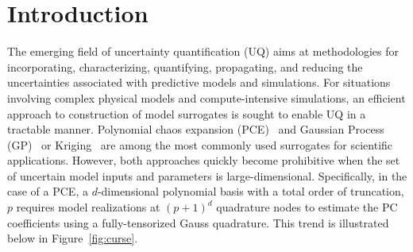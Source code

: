 \section{Introduction}
\label{sec:intro}


The emerging field of uncertainty quantification (UQ) aims at methodologies for 
incorporating, characterizing, quantifying, propagating, and reducing the 
uncertainties associated with predictive models and simulations. For situations
involving complex physical models and compute-intensive simulations, an
efficient approach to construction of model surrogates is sought to enable UQ
in a tractable manner. Polynomial chaos expansion 
(PCE)~\cite{Xiu:2002,Ghanem:2003,Eldred:2008,Olivier:2010} and 
Gaussian Process (GP)~\cite{Rasmussen:2004} or Kriging~\cite{Stein:2012} are
among the most commonly used surrogates for scientific applications. However,
both approaches quickly become prohibitive when the set of uncertain model
inputs and parameters is large-dimensional. Specifically, in the case of a PCE,
a $d$-dimensional polynomial basis with a total order of truncation, $p$ 
requires model realizations at $(p+1)^d$ quadrature nodes to estimate the PC
coefficients using a fully-tensorized Gauss quadrature. This trend is 
illustrated below in Figure~\ref{fig:curse}.

